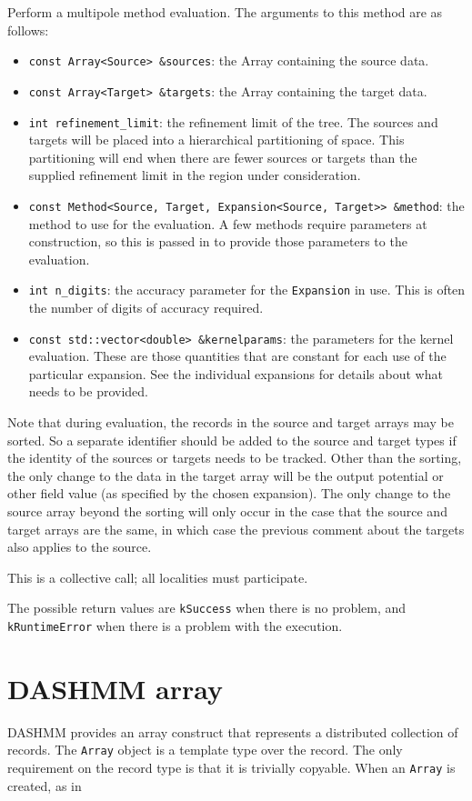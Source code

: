\noindent Perform a multipole method evaluation. The arguments to this method
are as follows:

\begin{itemize}
\item \texttt{const Array<Source> \&sources}: the Array containing the source
  data.
\item \texttt{const Array<Target> \&targets}: the Array containing the target
  data.
\item \texttt{int refinement\_limit}: the refinement limit of the tree. The
  sources and  targets will be placed into a hierarchical partitioning of
  space. This partitioning will end when there are fewer sources or targets than
  the supplied refinement limit in the region under consideration.
\item \texttt{const Method<Source, Target, Expansion<Source, Target>> \&method}:
  the  method to use for the evaluation. A few methods require parameters at
  construction, so this is passed in to provide those parameters to the
  evaluation.
\item \texttt{int n\_digits}: the accuracy parameter for the \texttt{Expansion}
  in use. This is  often the number of digits of accuracy required.
\item \texttt{const std::vector<double> \&kernelparams}: the parameters for the
  kernel evaluation. These are those quantities that are constant for each use
  of the particular expansion. See
  the individual expansions for details about what needs to be provided.
\end{itemize}

Note that during evaluation, the records in the source and target arrays may be
sorted. So a separate identifier should be added to the source and target types
if the identity of the sources or targets needs to be tracked. Other than the
sorting, the only change to the data in the target array will be the output
potential or other field value (as specified by the chosen expansion). The
only change to the source array beyond the sorting will only occur in the case
that the source and target arrays are the same, in which case the previous
comment about the targets also applies to the source.

This is a collective call; all localities must participate.

The possible return values are \texttt{kSuccess} when there is no problem, and
\texttt{kRuntimeError} when there is a problem with the execution.


\section{DASHMM array}
DASHMM provides an array construct that represents a distributed collection of
records. The \texttt{Array} object is a template
type over the record. The only requirement on the record type is that it is
trivially copyable. When an \texttt{Array} is created, as in

